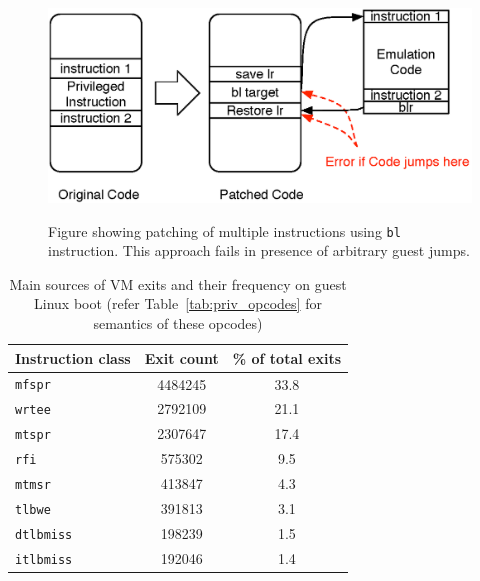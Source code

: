 \documentclass[10pt,twocolumn]{article}
\begin{document}
\begin{figure}[!htb]
\centering
\includegraphics[scale=0.5]{multiple_ins_patching.eps}
\label{fig:multiple_insns_patching}
\caption{Figure showing patching of multiple instructions using {\tt bl} instruction. This approach fails in presence of arbitrary guest jumps.}
\end{figure}

\begin{table}[!b]
\centering
     \begin{tabular}{lcc} \hline
       Instruction class  & Exit count & \% of total exits  \\ \hline
       {\tt mfspr} & 4484245 & 33.8  \\
       {\tt wrtee} & 2792109 & 21.1  \\
       {\tt mtspr} & 2307647 & 17.4  \\
       {\tt rfi} & 575302 & 9.5 \\
       {\tt mtmsr} & 413847 & 4.3 \\
       {\tt tlbwe} & 391813 & 3.1 \\
       {\tt dtlbmiss} & 198239 & 1.5 \\
       {\tt itlbmiss} & 192046 & 1.4 \\
       \hline
     \end{tabular}
\label{tab:linuxboot_exitcount}
\caption{Main sources of VM exits and their frequency on guest Linux boot (refer Table~\ref{tab:priv_opcodes} for semantics of these opcodes)}
\end{table}
\end{document}
